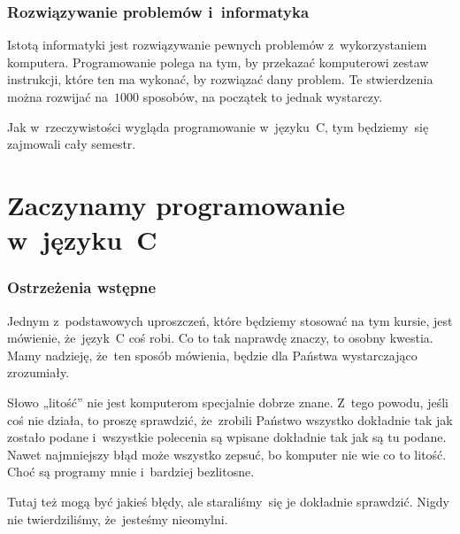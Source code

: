 \documentclass[10pt,t]{beamer}
\begin{document}
\begin{frame}
  \frametitle{Rozwiązywanie problemów i~informatyka}


  Istotą informatyki jest rozwiązywanie pewnych problemów z~wykorzystaniem
  komputera. Programowanie polega na tym, by przekazać komputerowi zestaw
  instrukcji, które ten ma wykonać, by rozwiązać dany problem. Te
  stwierdzenia można rozwijać na~$1000$ sposobów, na początek to jednak
  wystarczy.

  Jak w~rzeczywistości wygląda programowanie w~języku~C, tym będziemy~się
  zajmowali cały semestr.

\end{frame}










\section{Zaczynamy programowanie w~języku~C}


\begin{frame}
  \frametitle{Ostrzeżenia wstępne}


  Jednym z~podstawowych uproszczeń, które będziemy stosować na tym kursie,
  jest mówienie, że~język~C coś robi. Co to tak naprawdę znaczy, to osobny
  kwestia. Mamy nadzieję, że~ten sposób mówienia, będzie dla Państwa
  wystarczająco zrozumiały.

  Słowo „litość” nie jest komputerom specjalnie dobrze znane. Z~tego
  powodu, jeśli coś nie działa, to proszę sprawdzić, że~zrobili
  Państwo \alert{wszystko} dokładnie tak jak zostało podane i~wszystkie
  polecenia są wpisane \alert{dokładnie} tak jak są tu podane. Nawet
  najmniejszy błąd może wszystko zepsuć, bo komputer nie wie co to litość.
  Choć są programy mnie i~bardziej bezlitosne.

  Tutaj też mogą być jakieś błędy, ale staraliśmy~się je dokładnie
  sprawdzić. Nigdy nie twierdziliśmy, że~jesteśmy nieomylni.

\end{frame}
\end{document}
